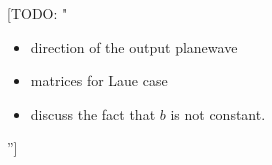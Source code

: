 \documentclass[preprint]{iucr}              %
\newcommand{\todo}[1]{{\color{red}[TODO: "#1'']}}
\newcommand{\inblue}[1]{{\color{blue}#1}}
\begin{document}





\newpage
\todo{
\begin{itemize}
    \item direction of the output planewave
    \item matrices for Laue case
    \item discuss the fact that $b$ is not constant.
\end{itemize}
}
\end{document}
